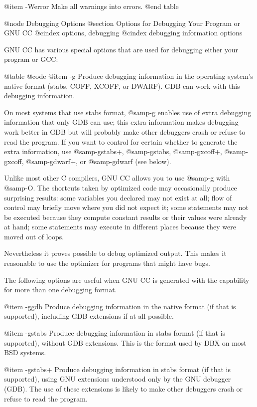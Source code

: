 {@item -Werror
Make all warnings into errors.
@end table

@node Debugging Options
@section Options for Debugging Your Program or GNU CC
@cindex options, debugging
@cindex debugging information options

GNU CC has various special options that are used for debugging
either your program or GCC:

@table @code
@item -g
Produce debugging information in the operating system's native format
(stabs, COFF, XCOFF, or DWARF).  GDB can work with this debugging
information.

On most systems that use stabs format, @samp{-g} enables use of extra
debugging information that only GDB can use; this extra information
makes debugging work better in GDB but will probably make other debuggers
crash or
refuse to read the program.  If you want to control for certain whether
to generate the extra information, use @samp{-gstabs+}, @samp{-gstabs},
@samp{-gxcoff+}, @samp{-gxcoff}, @samp{-gdwarf+}, or @samp{-gdwarf}
(see below).

Unlike most other C compilers, GNU CC allows you to use @samp{-g} with
@samp{-O}.  The shortcuts taken by optimized code may occasionally
produce surprising results: some variables you declared may not exist
at all; flow of control may briefly move where you did not expect it;
some statements may not be executed because they compute constant
results or their values were already at hand; some statements may
execute in different places because they were moved out of loops.

Nevertheless it proves possible to debug optimized output.  This makes
it reasonable to use the optimizer for programs that might have bugs.

The following options are useful when GNU CC is generated with the
capability for more than one debugging format.

@item -ggdb
Produce debugging information in the native format (if that is supported),
including GDB extensions if at all possible.

@item -gstabs
Produce debugging information in stabs format (if that is supported),
without GDB extensions.  This is the format used by DBX on most BSD
systems.

@item -gstabs+
Produce debugging information in stabs format (if that is supported),
using GNU extensions understood only by the GNU debugger (GDB).  The
use of these extensions is likely to make other debuggers crash or
refuse to read the program.

}
